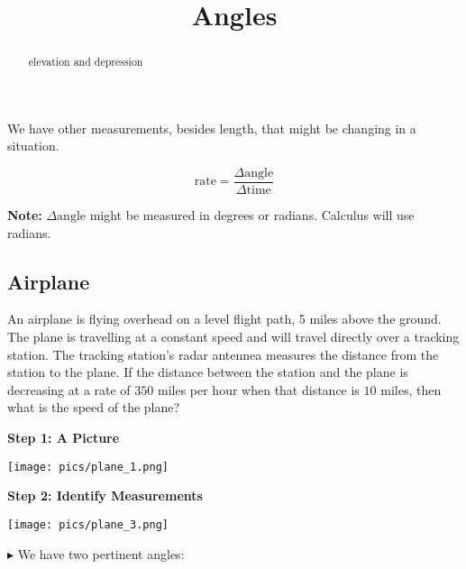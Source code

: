 \documentclass{ximera}
\title{Angles}
\begin{document}
\begin{abstract}
elevation and depression
\end{abstract}
\maketitle


We have other measurements, besides length, that might be changing in a situation.




\[
\text{rate} = \frac{\Delta \text{angle}}{\Delta \text{time}} 
\]

\textbf{Note:} $\Delta \text{angle}$ might be measured in degrees or radians. Calculus will use radians.\\






\subsection*{Airplane}

An airplane is flying overhead on a level flight path, 5 miles above the ground.  The plane is travelling at a constant speed and will travel directly over a tracking station. The tracking station's radar antennea measures the distance from the station to the plane. If the distance between the station and the plane is decreasing at a rate of $350$ miles per hour when that distance is $10$ miles, then what is the speed of the plane?









\textbf{\textcolor{purple!85!blue}{Step 1: A Picture}}


\begin{image}
\texttt{[image: pics/plane\_1.png]}
\end{image}




\textbf{\textcolor{purple!85!blue}{Step 2: Identify Measurements}}



\begin{image}
\texttt{[image: pics/plane\_3.png]}
\end{image}










$\blacktriangleright$ We have two pertinent angles:
\end{document}
